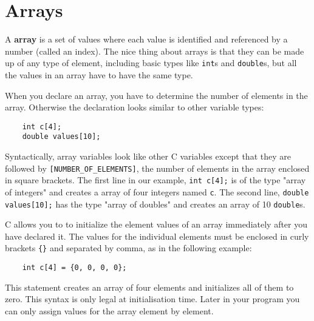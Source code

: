 

\chapter{Arrays}
\label{arrays}

A {\bf array} is a set of values where each value is identified and referenced by a
number (called an index).  The nice thing
about arrays is that they can be made up of any type of element,
including basic types like {\tt int}s and {\tt double}s, 
but all the values in an array have to have the same type.


When you declare an array, you have to determine the number of
elements in the array. Otherwise the declaration looks similar to other variable types:

\begin{verbatim}
    int c[4];
    double values[10];
\end{verbatim}


%

Syntactically, array variables look like other C variables except that they are followed 
by {\tt [NUMBER\_OF\_ELEMENTS]}, the number of elements in the array enclosed in square brackets. 
The first line in our example, {\tt int c[4];} is of the type "array of integers" and creates a array of four integers named {\tt c}.
The second line, {\tt double values[10];} has the type "array of doubles" and
  creates an array of 10 {\tt double}s. 


%

C allows you to to initialize the element values of an array immediately
after you have declared it.  The values  for the individual elements must be 
enclosed in curly brackets {\tt \{\}} and separated by comma, as in the following example:

\begin{verbatim}
    int c[4] = {0, 0, 0, 0};
\end{verbatim}

This statement creates an array of four elements and initializes
all of them to zero.
This syntax is only legal at initialisation time. Later in your program you can only
assign values for the array element by element.

